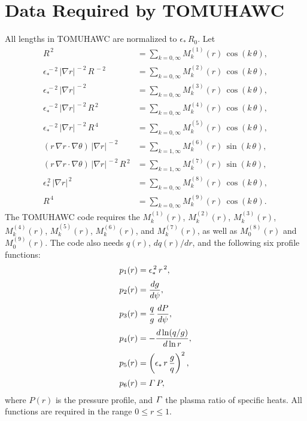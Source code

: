 \documentclass[12pt,prb,aps,notitlepage]{revtex4-1}
\begin{document}
\section{Data Required by {\sc TOMUHAWC}}
All lengths in {\sc TOMUHAWC} are normalized to $\epsilon_\ast\,R_0$. 
Let
\begin{align}
R^{\,2}&= \sum_{k=0,\infty} M^{(1)}_k(r)\,\cos(k\,\theta),\\[0.5ex]
\epsilon_\ast^{\,-2}\,|\nabla r|^{\,-2}\,R^{\,-2}&= \sum_{k=0,\infty} M^{(2)}_k(r)\,\cos(k\,\theta),\\[0.5ex]
\epsilon_\ast^{\,-2}\,|\nabla r|^{\,-2}&= \sum_{k=0,\infty} M^{(3)}_k(r)\,\cos(k\,\theta),\\[0.5ex]
\epsilon_\ast^{\,-2}\,|\nabla r|^{\,-2}\,R^{\,2} &= \sum_{k=0,\infty} M^{(4)}_k(r)\,\cos(k\,\theta),\\[0.5ex]
\epsilon_\ast^{\,-2}\,|\nabla r|^{\,-2}\,R^{\,4}  &= \sum_{k=0,\infty} M^{(5)}_k(r)\,\cos(k\,\theta),\\[0.5ex]
(r\,\nabla r\cdot\nabla \theta)\, |\nabla r|^{\,-2}&= \sum_{k=1,\infty} M^{(6)}_k(r)\,\sin(k\,\theta),\\[0.5ex]
(r\,\nabla r\cdot\nabla \theta)\, |\nabla r|^{\,-2}\,R^{\,2}&= \sum_{k=1,\infty} M^{(7)}_k(r)\,\sin(k\,\theta),\\[0.5ex]
\epsilon_\ast^{\,2}\,|\nabla r|^{\,2}&= \sum_{k=0,\infty} M^{(8)}_k(r)\,\cos(k\,\theta),\\[0.5ex]
R^{\,4}&= \sum_{k=0,\infty} M^{(9)}_k(r)\,\cos(k\,\theta).
\end{align}
The {\sc TOMUHAWC} code requires the $M^{(1)}_k(r)$, $M^{(2)}_k(r)$, $M^{(3)}_k(r)$, $M^{(4)}_k(r)$,
$M^{(5)}_k(r)$, $M^{(6)}_k(r)$, and $M^{(7)}_k(r)$, as well as $M^{(8)}_0(r)$ and $M^{(9)}_0(r)$. The code also needs 
$q(r)$, $dq(r)/dr$, and the following six profile
functions:
\begin{align}
p_1(r) &= \epsilon_\ast^{\,2}\,r^{\,2},\\[0.5ex]
p_2(r) &=\frac{dg}{d\psi},\\[0.5ex]
p_3(r) &= \frac{q}{g}\,\frac{dP}{d\psi},\\[0.5ex]
p_4(r) &= -\frac{d\ln(q/g)}{d\ln r},\\[0.5ex]
p_5(r) & = \left(\epsilon_\ast\,r\,\frac{g}{q}\right)^2,\\[0.5ex]
p_6(r) &= {\mit\Gamma}\,P,
\end{align}
where $P(r)$ is the pressure profile, and ${\mit\Gamma}$ the plasma ratio of specific heats. 
All functions are required in the range $0\leq r\leq 1$. 
\end{document}

